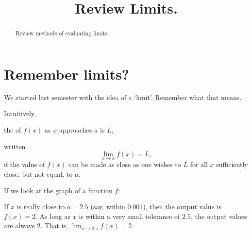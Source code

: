 \documentclass{ximera}
\title[Dig-In:]{Review Limits.}
\begin{document}
\begin{abstract}
  Review methods of evaluating limits.
\end{abstract}
\maketitle


\section{Remember limits?}

We started last semester with the idea of a `limit'.  Remember what that means.
\begin{definition}
  Intuitively,
  \begin{center}
    the  of $f(x)$ as $x$ approaches $a$ is $L$,
  \end{center}
  written
  \[
  \lim_{x\to a} f(x) = L,
  \]
  if the value of $f(x)$ can be made as close as one wishes to $L$ for
  all $x$ sufficiently close, but not equal, to $a$.
\end{definition}
If we look at the graph of a function $f$:
\begin{image}
\end{image}
If $x$ is really close to $a = 2.5$ (say, within $0.001$), then the output value is $f(x) = 2$.  As long as $x$ is within
a very small tolerance of $2.5$, the output values are always $2$.  That is, $\displaystyle \lim_{x\to 2.5} f(x) = 2$.
\end{document}
